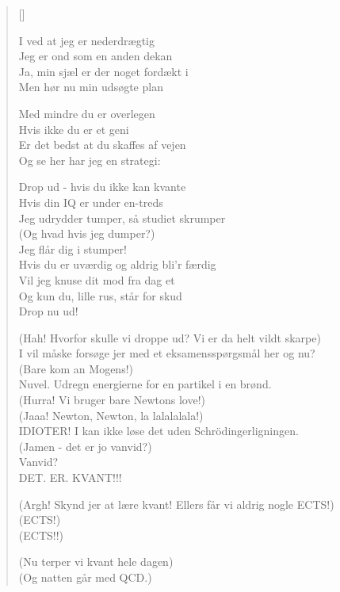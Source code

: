 \begin{multicols}{2}
\settowidth{\versewidth}{Jeg udrydder tumper, så studiet skrumper}
\begin{verse}[\versewidth]

I ved at jeg er nederdrægtig\\
Jeg er ond som en anden dekan\\
Ja, min sjæl er der noget fordækt i\\
Men hør nu min udsøgte plan

Med mindre du er overlegen\\
Hvis ikke du er et geni\\
Er det bedst at du skaffes af vejen\\
Og se her har jeg en strategi:

Drop ud - hvis du ikke kan kvante\\
Hvis din IQ er under en-treds\\
Jeg udrydder tumper, så studiet skrumper\\
(Og hvad hvis jeg dumper?)\\
Jeg flår dig i stumper!\\
Hvis du er uværdig og aldrig bli'r færdig\\
Vil jeg knuse dit mod fra dag et\\
Og kun du, lille rus, står for skud\\
Drop nu ud!

(Hah! Hvorfor skulle vi droppe ud? Vi er da helt vildt skarpe)\\
I vil måske forsøge jer med et eksamensspørgsmål her og nu?\\
(Bare kom an Mogens!)\\
Nuvel. Udregn energierne for en partikel i en brønd.\\
(Hurra! Vi bruger bare Newtons love!)\\
(Jaaa! Newton, Newton, la lalalalala!)\\
IDIOTER! I kan ikke løse det uden Schrödingerligningen.\\
(Jamen - det er jo vanvid?)\\
Vanvid?\\
DET. ER. KVANT!!!

(Argh! Skynd jer at lære kvant! Ellers får vi aldrig nogle ECTS!)\\
(ECTS!)\\
(ECTS!!)

(Nu terper vi kvant hele dagen)\\
(Og natten går med QCD.)


\end{verse}
\end{multicols}
